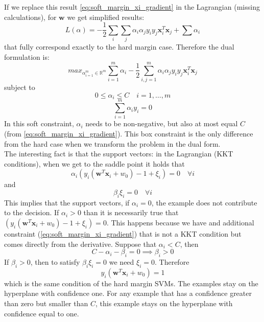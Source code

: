If we replace this result \ref{eq:soft_margin_xi_gradient} in the Lagrangian (missing
calculations), for $\pmb{w}$ we get simplified results:
\[
	L(\alpha) = -\frac{1}{2}\sum_{i}\sum_{j}\alpha_{i}\alpha_{j}y_{i}y_{j}\pmb{x}_{i}
	^{T}\pmb{x}_{j}+ \sum \alpha_{i}
\]
that fully correspond exactly to the hard margin case. Therefore the dual formulation
is:
\begin{equation}
	max_{\alpha_{i=1}^m \in \mathbb{R}^m}\sum_{i=1}^{m}\alpha_{i}- \frac{1}{2}\sum_{i,
	j = 1}^{m}\alpha_{i}\alpha_{j}y_{i}y_{j}\pmb{x}_{i}^{T}\pmb{x}_{j}\label{eq:dual_formulation_object_soft}
\end{equation}
subject to
\[
	0 \leq \alpha_{i}\leq C \quad i = 1, \dots, m
\]
\[
	\sum_{i=1}^{m}\alpha_{i}y_{i}= 0
\]
In this soft constraint, $\alpha_{i}$ needs to be non-negative, but also at most
equal $C$ (from \ref{eq:soft_margin_xi_gradient}). This box constraint is the only
difference from the hard case when we transform the problem in the dual form.\\

The interesting fact is that the support vectors: in the Lagrangian (KKT
conditions), when we get to the saddle point it holds that
\[
	\alpha_{i}(y_{i}(\pmb{w}^{T}\pmb{x}_{i}+ w_{0}) - 1 + \xi_{i}) = 0 \quad \forall
	i
\]
and
\[
	\beta_{i}\xi_{i}= 0 \quad \forall i
\]
This implies that the support vectors, if $\alpha_{i}= 0$, the example does not
contribute to the decision. If $\alpha_{i}> 0$ than it is necessarily true that $(
y_{i}(\pmb{w}^{T}\pmb{x}_{i}+ w_{0}) - 1 + \xi_{i}) = 0$. This happens because
we have and additional constraint (\ref{eq:soft_margin_xi_gradient}) that is not
a KKT condition but comes directly from the derivative. Suppose that $\alpha_{i}<
C$, then
\[
	C - \alpha_{i}- \beta_{i}= 0 \implies \beta_{i}> 0
\]
If $\beta_{i}> 0$, then to satisfy $\beta_{i}\xi_{i}= 0$ we need $\xi_{i}= 0$.
Therefore
\[
	y_{i}(\pmb{w}^{T}\pmb{x}_{i}+ w_{0}) = 1
\]
which is the same condition of the hard margin SVMs. The examples stay on the hyperplane
with confidence one. For any example that has a confidence greater than zero but
smaller than $C$, this example stays on the hyperplane with confidence equal to one.
\\


